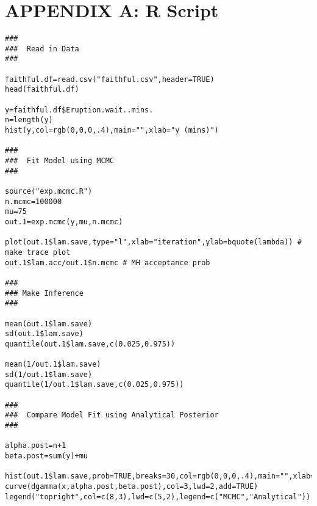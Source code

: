 \documentclass[12pt]{article} \topmargin=.1in \oddsidemargin=.25in
\begin{document}
\section*{APPENDIX A: R Script}
\begin{verbatim} 
###
###  Read in Data
###

faithful.df=read.csv("faithful.csv",header=TRUE)
head(faithful.df)

y=faithful.df$Eruption.wait..mins.
n=length(y)
hist(y,col=rgb(0,0,0,.4),main="",xlab="y (mins)")

###
###  Fit Model using MCMC 
###

source("exp.mcmc.R")
n.mcmc=100000
mu=75
out.1=exp.mcmc(y,mu,n.mcmc)

plot(out.1$lam.save,type="l",xlab="iteration",ylab=bquote(lambda)) # make trace plot
out.1$lam.acc/out.1$n.mcmc # MH acceptance prob 

###
### Make Inference
###

mean(out.1$lam.save)
sd(out.1$lam.save)
quantile(out.1$lam.save,c(0.025,0.975))

mean(1/out.1$lam.save)
sd(1/out.1$lam.save)
quantile(1/out.1$lam.save,c(0.025,0.975))

###
###  Compare Model Fit using Analytical Posterior
###

alpha.post=n+1
beta.post=sum(y)+mu

hist(out.1$lam.save,prob=TRUE,breaks=30,col=rgb(0,0,0,.4),main="",xlab=bquote(lambda))
curve(dgamma(x,alpha.post,beta.post),col=3,lwd=2,add=TRUE)
legend("topright",col=c(8,3),lwd=c(5,2),legend=c("MCMC","Analytical"))
\end{verbatim} 
\end{document}

